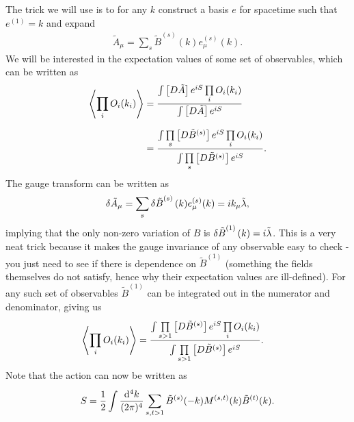 The trick we will use is to for any $k$ construct a basis $e$ for spacetime such that $e^{(1)} = k$ and expand
\begin{align*}
	\tilde{A}_{\mu} = \sum\limits_{s}\tilde{B}^{(s)}(k)e_{\mu}^{(s)}(k).
\end{align*}
We will be interested in the expectation values of some set of observables, which can be written as
\begin{align*}
	\expval{\prod\limits_{i}O_{i}(k_{i})} &= \frac{\int\limits_{}\left[D\tilde{A}\right]e^{iS}\prod\limits_{i}O_{i}(k_{i})}{\int\limits_{}\left[D\tilde{A}\right]e^{iS}} \\
	&= \frac{\int\limits_{}^{}\prod\limits_{s}\left[D\tilde{B}^{(s)}\right]e^{iS}\prod\limits_{i}O_{i}(k_{i})}{\int\limits_{}^{}\prod\limits_{s}\left[D\tilde{B}^{(s)}\right]e^{iS}}.
\end{align*}
The gauge transform can be written as
\begin{align*}
	\var{\tilde{A}_{\mu}} = \sum\limits_{s}\var{\tilde{B}}^{(s)}(k)e_{\mu}^{(s)}(k) = ik_{\mu}\tilde{\lambda},
\end{align*}
implying that the only non-zero variation of $B$ is $\var{\tilde{B}}^{(1)}(k) = i\tilde{\lambda}$. This is a very neat trick because it makes the gauge invariance of any observable easy to check - you just need to see if there is dependence on $\tilde{B}^{(1)}$ (something the fields themselves do not satisfy, hence why their expectation values are ill-defined). For any such set of observables $\tilde{B}^{(1)}$ can be integrated out in the numerator and denominator, giving us
\begin{align*}
	\expval{\prod\limits_{i}O_{i}(k_{i})} &= \frac{\int\limits_{}^{}\prod\limits_{s > 1}\left[D\tilde{B}^{(s)}\right]e^{iS}\prod\limits_{i}O_{i}(k_{i})}{\int\limits_{}^{}\prod\limits_{s > 1}\left[D\tilde{B}^{(s)}\right]e^{iS}}.
\end{align*}
Note that the action can now be written as
\begin{align*}
	S = \frac{1}{2}\int\limits_{}^{}\frac{\dd[4]{k}}{(2\pi)^{4}}\sum\limits_{s, t > 1}\tilde{B}^{(s)}(-k)M^{(s, t)}(k)\tilde{B}^{(t)}(k).
\end{align*}

